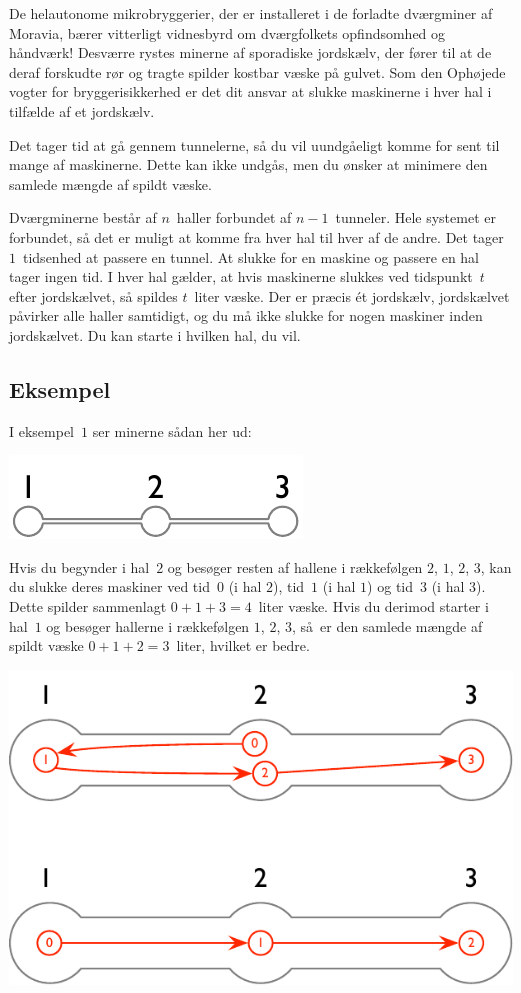 
\noindent
De helautonome mikrobryggerier, der er installeret i de forladte dværgminer af Moravia, bærer vitterligt vidnesbyrd om dværgfolkets opfindsomhed og håndværk!
Desværre rystes minerne af sporadiske jordskælv, der fører til at de deraf forskudte rør og tragte spilder kostbar væske på gulvet.
Som den Ophøjede vogter for bryggerisikkerhed er det dit ansvar at slukke maskinerne i hver hal i tilfælde af et jordskælv.

Det tager tid at gå gennem tunnelerne,
så du vil uundgåeligt komme for sent til mange af maskinerne.
Dette kan ikke undgås, men du ønsker at minimere den samlede mængde af spildt væske.

\medskip
Dværgminerne består af $n$~haller forbundet af $n-1$~tunneler.
Hele systemet er forbundet, så det er muligt at komme fra hver hal til hver af de andre.
Det tager $1$~tidsenhed at passere en tunnel.
At slukke for en maskine og passere en hal tager ingen tid.
I hver hal gælder, at hvis maskinerne slukkes ved tidspunkt~$t$ efter jordskælvet, så spildes $t$~liter væske.
Der er præcis ét jordskælv, jordskælvet påvirker alle haller samtidigt, og du må ikke slukke for nogen maskiner inden jordskælvet.
Du kan starte i hvilken hal, du vil.



\subsection*{Eksempel}

I eksempel~$1$ ser minerne sådan her ud:

\includegraphics[width=.2\textwidth]{img/sample-1.pdf}

Hvis du begynder i hal~$2$ og besøger resten af hallene i rækkefølgen $2$, $1$, $2$, $3$, kan du slukke deres maskiner ved tid~$0$ (i hal $2$), tid~$1$ (i hal $1$) og tid~$3$ (i hal $3$).
Dette spilder sammenlagt $0+1+3=4$~liter væske.
Hvis du derimod starter i hal~$1$ og besøger hallerne i rækkefølgen $1$, $2$, $3$, så er den samlede mængde af spildt væske $0+1+2=3$~liter, hvilket er bedre.

\includegraphics[width=.4\textwidth]{img/sample-1-ans.pdf}

